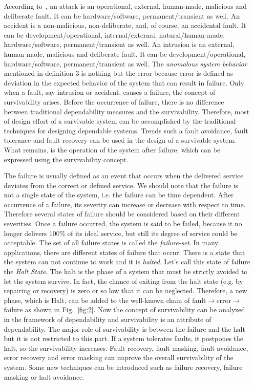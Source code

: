 \documentclass[onecolumn,conference]{IEEEtran}
\begin{document}
    According to~\cite{b1}, an attack is an operational, external, human-made, malicious and deliberate fault. It can be hardware/software, permanent/transient as well. An accident is a non-malicious, non-deliberate, and, of course, an accidental fault. It can be development/operational, internal/external, natural/human-made, hardware/software, permanent/transient as well. An intrusion is an external, human-made, malicious and deliberate fault. It can be development/operational, hardware/software, permanent/transient as well. The \textit{anomalous system behavior} mentioned in definition 3 is nothing but the error because error is defined as deviation in the expected behavior of the system that can result in failure.  Only when a fault, say intrusion or accident, causes a failure, the concept of survivability arises. Before the occurrence of failure, there is no difference between traditional dependability measures and the survivability. Therefore, most of design effort of a survivable system can be accomplished by the traditional techniques for designing dependable systems. Trends such a fault avoidance, fault tolerance and fault recovery can be used in the design of a survivable system. What remains, is the operation of the system after failure, which can be expressed using the survivability concept.

    The failure is usually defined as an event that occurs when the delivered service deviates from the correct or defined service. We should note that the failure is not a single state of the system, i.e. the failure can be time dependent. After occurrence of a failure, its severity can increase or decrease with respect to time. Therefore several states of failure should be considered based on their different severities. Once a failure occurred, the system is said to be failed, because it no longer delivers 100\% of its ideal service, but still its degree of service could be acceptable. The set of all failure states is called the \textit{failure-set}. In many applications, there are different states of failure that occur. There is a state that the system can not continue to work and it is \textit{halted}. Let's call this state of failure the \textit{Halt State}. The halt is the phase of a system that must be strictly avoided to let the system survive. In fact, the chance of exiting from the halt state (e.g. by repairing or recovery) is zero or so low that it can be neglected. Therefore, a new phase, which is Halt, can be added to the well-known chain of fault$\rightarrow$error$\rightarrow$failure as shown in Fig.~\ref{fig:2}. Now the concept of survivability can be analyzed in the framework of dependability and survivability is an attribute of dependability. The major role of survivability is between the failure and the halt but it is not restricted to this part. If a system tolerates faults, it postpones the halt, so the survivability increases. Fault recovery, fault masking, fault avoidance, error recovery and error masking can improve the overall survivability of the system. Some new techniques can be introduced such as failure recovery, failure masking or halt avoidance.
\end{document}
